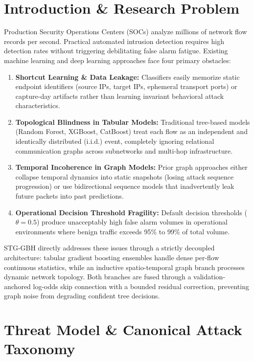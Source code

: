 \documentclass[11pt,a4paper]{article}
\begin{document}
\newpage

\section{Introduction \& Research Problem}
\label{sec:intro}

Production Security Operations Centers (SOCs) analyze millions of network flow records per second. Practical automated intrusion detection requires high detection rates without triggering debilitating false alarm fatigue. Existing machine learning and deep learning approaches face four primary obstacles:

\begin{enumerate}[itemsep=4pt]
    \item \textbf{Shortcut Learning \& Data Leakage:} Classifiers easily memorize static endpoint identifiers (source IPs, target IPs, ephemeral transport ports) or capture-day artifacts rather than learning invariant behavioral attack characteristics.
    \item \textbf{Topological Blindness in Tabular Models:} Traditional tree-based models (Random Forest, XGBoost, CatBoost) treat each flow as an independent and identically distributed (i.i.d.) event, completely ignoring relational communication graphs across subnetworks and multi-hop infrastructure.
    \item \textbf{Temporal Incoherence in Graph Models:} Prior graph approaches either collapse temporal dynamics into static snapshots (losing attack sequence progression) or use bidirectional sequence models that inadvertently leak future packets into past predictions.
    \item \textbf{Operational Decision Threshold Fragility:} Default decision thresholds ($\theta = 0.5$) produce unacceptably high false alarm volumes in operational environments where benign traffic exceeds 95\% to 99\% of total volume.
\end{enumerate}

STG-GBH directly addresses these issues through a strictly decoupled architecture: tabular gradient boosting ensembles handle dense per-flow continuous statistics, while an inductive spatio-temporal graph branch processes dynamic network topology. Both branches are fused through a validation-anchored log-odds skip connection with a bounded residual correction, preventing graph noise from degrading confident tree decisions.

\section{Threat Model \& Canonical Attack Taxonomy}
\label{sec:threat_model}
\end{document}
